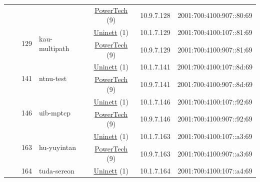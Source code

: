 \begin{small}
\begin{center}
\begin{longtable}{|c|c|c|c|c|c|c|c|}
  &  &  &  & \multicolumn{2}{|c|}{\tiny{\href{http://www.powertech.no}{PowerTech} (9)}} & \tiny{10.9.7.128} & \tiny{2001:700:4100:907::80:69} \\* \cline{3-3}\cline{4-4}\cline{5-5}\cline{6-6}\cline{7-7}\cline{8-8}
  &  & \multirow{2}{*}{\tiny{129}} & \multicolumn{1}{|l|}{\multirow{2}{*}{\tiny{kau-multipath}}} & \multicolumn{2}{|c|}{\tiny{\href{https://www.uninett.no}{Uninett} (1)}} & \tiny{10.1.7.129} & \tiny{2001:700:4100:107::81:69} \\* \cline{5-5}\cline{6-6}\cline{7-7}\cline{8-8}
  &  &  &  & \multicolumn{2}{|c|}{\tiny{\href{http://www.powertech.no}{PowerTech} (9)}} & \tiny{10.9.7.129} & \tiny{2001:700:4100:907::81:69} \\* \cline{3-3}\cline{4-4}\cline{5-5}\cline{6-6}\cline{7-7}\cline{8-8}
  &  & \multirow{2}{*}{\tiny{141}} & \multicolumn{1}{|l|}{\multirow{2}{*}{\tiny{ntnu-test}}} & \multicolumn{2}{|c|}{\tiny{\href{https://www.uninett.no}{Uninett} (1)}} & \tiny{10.1.7.141} & \tiny{2001:700:4100:107::8d:69} \\* \cline{5-5}\cline{6-6}\cline{7-7}\cline{8-8}
  &  &  &  & \multicolumn{2}{|c|}{\tiny{\href{http://www.powertech.no}{PowerTech} (9)}} & \tiny{10.9.7.141} & \tiny{2001:700:4100:907::8d:69} \\* \cline{3-3}\cline{4-4}\cline{5-5}\cline{6-6}\cline{7-7}\cline{8-8}
  &  & \multirow{2}{*}{\tiny{146}} & \multicolumn{1}{|l|}{\multirow{2}{*}{\tiny{uib-mptcp}}} & \multicolumn{2}{|c|}{\tiny{\href{https://www.uninett.no}{Uninett} (1)}} & \tiny{10.1.7.146} & \tiny{2001:700:4100:107::92:69} \\* \cline{5-5}\cline{6-6}\cline{7-7}\cline{8-8}
  &  &  &  & \multicolumn{2}{|c|}{\tiny{\href{http://www.powertech.no}{PowerTech} (9)}} & \tiny{10.9.7.146} & \tiny{2001:700:4100:907::92:69} \\* \cline{3-3}\cline{4-4}\cline{5-5}\cline{6-6}\cline{7-7}\cline{8-8}
  &  & \multirow{2}{*}{\tiny{163}} & \multicolumn{1}{|l|}{\multirow{2}{*}{\tiny{hu-yuyintan}}} & \multicolumn{2}{|c|}{\tiny{\href{https://www.uninett.no}{Uninett} (1)}} & \tiny{10.1.7.163} & \tiny{2001:700:4100:107::a3:69} \\* \cline{5-5}\cline{6-6}\cline{7-7}\cline{8-8}
  &  &  &  & \multicolumn{2}{|c|}{\tiny{\href{http://www.powertech.no}{PowerTech} (9)}} & \tiny{10.9.7.163} & \tiny{2001:700:4100:907::a3:69} \\* \cline{3-3}\cline{4-4}\cline{5-5}\cline{6-6}\cline{7-7}\cline{8-8}
  &  & \multirow{2}{*}{\tiny{164}} & \multicolumn{1}{|l|}{\multirow{2}{*}{\tiny{tuda-sereon}}} & \multicolumn{2}{|c|}{\tiny{\href{https://www.uninett.no}{Uninett} (1)}} & \tiny{10.1.7.164} & \tiny{2001:700:4100:107::a4:69} \\* \cline{5-5}\cline{6-6}\cline{7-7}\cline{8-8}

\end{longtable}
\end{center}
\end{small}
